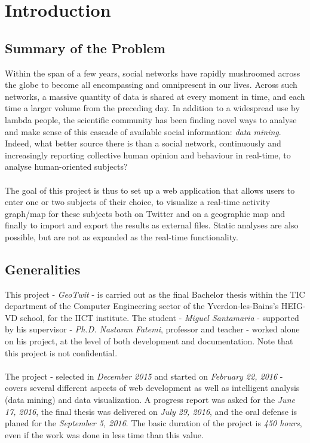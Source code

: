 \documentclass[a4paper,11pt]{report}
\begin{document}
\chapter{Introduction}
\section{Summary of the Problem}
Within the span of a few years, social networks have rapidly mushroomed across the globe to become all encompassing and omnipresent in our lives. Across such networks, a massive quantity of data is shared at every moment in time, and each time a larger volume from the preceding day. In addition to a widespread use by lambda people, the scientific community has been finding novel ways to analyse and make sense of this cascade of available social information: \emph{data mining}. Indeed, what better source there is than a social network, continuously and increasingly reporting collective human opinion and behaviour in real-time, to analyse human-oriented subjects?\\\\
The goal of this project is thus to set up a web application that allows users to enter one or two subjects of their choice, to visualize a real-time activity graph/map for these subjects both on Twitter and on a geographic map and finally to import and export the results as external files. Static analyses are also possible, but are not as expanded as the real-time functionality.
\bigskip

\section{Generalities}
This project - \emph{GeoTwit} - is carried out as the final Bachelor thesis within the TIC department of the Computer Engineering sector of the Yverdon-les-Bains's HEIG-VD school, for the IICT institute. The student - \emph{Miguel Santamaria} - supported by his supervisor - \emph{Ph.D. Nastaran Fatemi}, professor and teacher - worked alone on his project, at the level of both development and documentation. Note that this project is not confidential.\\\\
The project - selected in \emph{December 2015} and started on \emph{February 22, 2016} - covers several different aspects of web development as well as intelligent analysis (data mining) and data visualization. A progress report was asked for the \emph{June 17, 2016}, the final thesis was delivered on \emph{July 29, 2016}, and the oral defense is planed for the \emph{September 5, 2016}. The basic duration of the project is \emph{450 hours}, even if the work was done in less time than this value.
\bigskip
\end{document}
